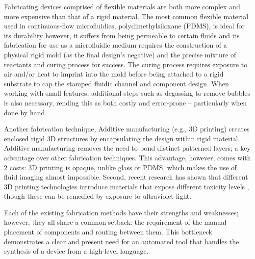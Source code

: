Fabricating devices comprised of flexible materials are both more complex and more expensive than that of a rigid material\cite{xia1998soft}. The most common flexible material used in continuous-flow microfluidics, polydimethylsiloxane (PDMS), is ideal for its durability however, it suffers from being permeable to certain fluids and its fabrication for use as a microfluidic medium requires the construction of a physical rigid mold (as the final design's negative) and the precise mixture of reactants and curing process for success. The curing process requires exposure to air and/or heat to imprint into the mold before being attached to a rigid substrate to cap the stamped fluidic channel and component design. When working with small features, additional steps such as degassing to remove bubbles is also necessary, rending this as both costly and error-prone -- particularly when done by hand.


Another fabrication technique, Additive manufacturing (e.g., 3D printing\cite{gong2016high,rogers20153d,waheed20163d}) creates enclosed rigid 3D structures by %
encapsulating the design within rigid material.
Additive manufacturing removes the need to bond distinct patterned layers; a key advantage over other fabrication techniques.
This advantage, however, comes with 2 costs: 3D printing is opaque, unlike glass or PDMS, which makes the use of fluid imaging almost impossible.
Second, recent research has shown that different 3D printing technologies introduce materials that expose different toxicity levels %
, though these can be remedied by exposure to ultraviolet light\cite{oskui2015assessing}.

Each of the existing fabrication methods have their strengths and weaknesses; however, they all share a common setback: the requirement of the manual placement of components and routing between them.
This bottleneck demonstrates a clear and present need for an automated tool that handles the synthesis of a device from a high-level language.

